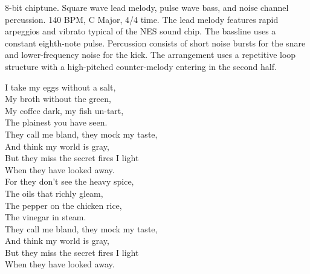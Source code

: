 

\begin{notes}
\end{notes}
\begin{style}
8-bit chiptune. %
Square wave lead melody, pulse wave bass, and noise channel percussion. %
140 BPM, C Major, 4/4 time. %
The lead melody features rapid arpeggios and vibrato typical of the NES sound chip. %
The bassline uses a constant eighth-note pulse. %
Percussion consists of short noise bursts for the snare and lower-frequency noise for the kick. %
The arrangement uses a repetitive loop structure with a high-pitched counter-melody entering in the second half.
\end{style}
\begin{lyrics}
I take my eggs without a salt,\\
My broth without the green,\\
My coffee dark, my fish un-tart,\\
The plainest you have seen.\\

They call me bland, they mock my taste,\\
And think my world is gray,\\
But they miss the secret fires I light\\
When they have looked away.\\

For they don't see the heavy spice,\\
The oils that richly gleam,\\
The pepper on the chicken rice,\\
The vinegar in steam.\\

They call me bland, they mock my taste,\\
And think my world is gray,\\
But they miss the secret fires I light\\
When they have looked away.\\
\end{lyrics}


